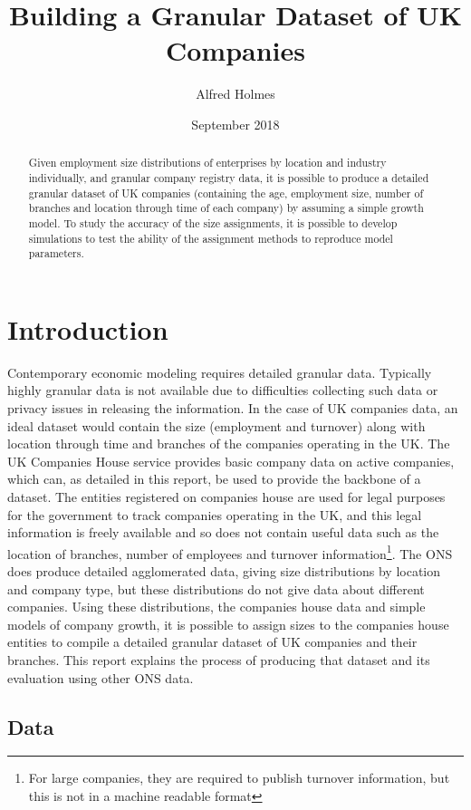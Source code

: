 \documentclass[a4paper,10pt]{article}
\title{Building a Granular Dataset of UK Companies}
\author{Alfred Holmes}
\date{September 2018}
\begin{document}
\maketitle
\begin{abstract}Given employment size distributions of enterprises by location and industry individually, and granular company registry data, it is possible to produce a detailed granular dataset of UK companies (containing the age, employment size, number of branches and location through time of each company) by assuming a simple growth model. To study the accuracy of the size assignments, it is possible to develop simulations to test the ability of the assignment methods to reproduce model parameters. 
\end{abstract}
 
\section{Introduction}
Contemporary economic modeling requires detailed granular data. Typically highly granular data is not available due to difficulties collecting such data or privacy issues in releasing the information. In the case of UK companies data, an ideal dataset would contain the size (employment and turnover) along with location through time and branches of the companies operating in the UK. The UK Companies House service provides basic company data on active companies, which can, as detailed in this report, be used to provide the backbone of a dataset. The entities registered on companies house are used for legal purposes for the government to track companies operating in the UK, and this legal information is freely available and so does not contain useful data such as the location of branches, number of employees and turnover information\footnote{For large companies, they are required to publish turnover information, but this is not in a machine readable format}. The ONS does produce detailed agglomerated data, giving size distributions by location and company type, but these distributions do not give data about different companies. Using these distributions, the companies house data and simple models of company growth, it is possible to assign sizes to the companies house entities to compile a detailed granular dataset of UK companies and their branches. This report explains the process of producing that dataset and its evaluation using other ONS data.  

\subsection{Data}
\end{document}

